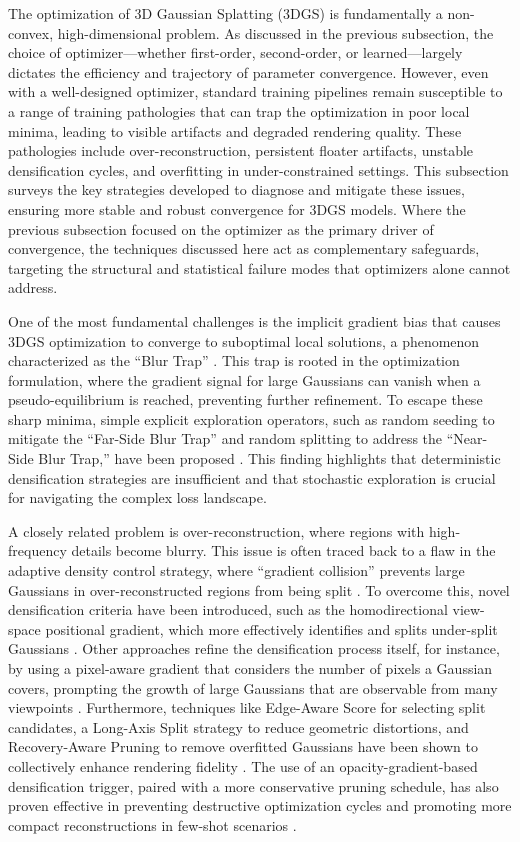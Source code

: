 \documentclass[11pt]{article}
\begin{document}
The optimization of 3D Gaussian Splatting (3DGS) is fundamentally a non-convex, high-dimensional problem. As discussed in the previous subsection, the choice of optimizer---whether first-order, second-order, or learned---largely dictates the efficiency and trajectory of parameter convergence. However, even with a well-designed optimizer, standard training pipelines remain susceptible to a range of training pathologies that can trap the optimization in poor local minima, leading to visible artifacts and degraded rendering quality. These pathologies include over-reconstruction, persistent floater artifacts, unstable densification cycles, and overfitting in under-constrained settings. This subsection surveys the key strategies developed to diagnose and mitigate these issues, ensuring more stable and robust convergence for 3DGS models. Where the previous subsection focused on the optimizer as the primary driver of convergence, the techniques discussed here act as complementary safeguards, targeting the structural and statistical failure modes that optimizers alone cannot address.

One of the most fundamental challenges is the implicit gradient bias that causes 3DGS optimization to converge to suboptimal local solutions, a phenomenon characterized as the ``Blur Trap'' \cite{ref172}. This trap is rooted in the optimization formulation, where the gradient signal for large Gaussians can vanish when a pseudo-equilibrium is reached, preventing further refinement. To escape these sharp minima, simple explicit exploration operators, such as random seeding to mitigate the ``Far-Side Blur Trap'' and random splitting to address the ``Near-Side Blur Trap,'' have been proposed \cite{ref172}. This finding highlights that deterministic densification strategies are insufficient and that stochastic exploration is crucial for navigating the complex loss landscape.

A closely related problem is over-reconstruction, where regions with high-frequency details become blurry. This issue is often traced back to a flaw in the adaptive density control strategy, where ``gradient collision'' prevents large Gaussians in over-reconstructed regions from being split \cite{ref118}. To overcome this, novel densification criteria have been introduced, such as the homodirectional view-space positional gradient, which more effectively identifies and splits under-split Gaussians \cite{ref118}. Other approaches refine the densification process itself, for instance, by using a pixel-aware gradient that considers the number of pixels a Gaussian covers, prompting the growth of large Gaussians that are observable from many viewpoints \cite{ref173}. Furthermore, techniques like Edge-Aware Score for selecting split candidates, a Long-Axis Split strategy to reduce geometric distortions, and Recovery-Aware Pruning to remove overfitted Gaussians have been shown to collectively enhance rendering fidelity \cite{ref42}. The use of an opacity-gradient-based densification trigger, paired with a more conservative pruning schedule, has also proven effective in preventing destructive optimization cycles and promoting more compact reconstructions in few-shot scenarios \cite{ref120}.
\end{document}
